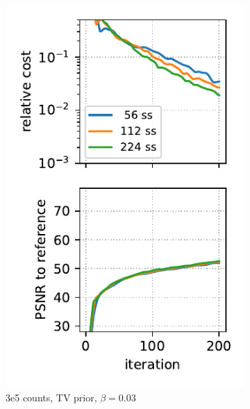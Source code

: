 \begin{figure}
  \centering
  \begin{subfigure}[b]{0.23\textwidth}
    \centering
    \includegraphics[width=1.0\textwidth]{./figs/brain2d_counts_3.0E+05_seed_1_beta_3.0E-02_prior_TV_niter_ref_20000_fwhm_4.5_4.5_niter_200_ss.pdf}
    \caption{3e5 counts, TV prior, $\beta = 0.03$}
  \end{subfigure}
  \hfill
  \begin{subfigure}[b]{0.23\textwidth}
    \centering

\end{subfigure}
\end{figure}
